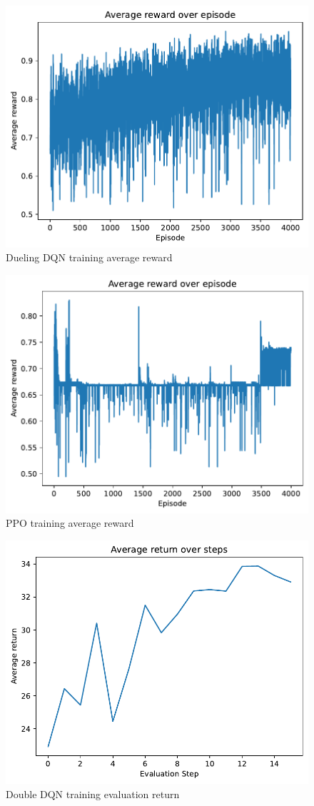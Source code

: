 \documentclass{article}
\begin{document}
\begin{figure}
    \centering
    \includegraphics[width=0.7\linewidth]{img/DuelDQN_training.pdf}
    \caption{Dueling DQN training average reward}
    \label{fig:Duel_DQN_reward_training}
\end{figure}

\begin{figure}
    \centering
    \includegraphics[width=0.7\linewidth]{img/PPO_training.pdf}
    \caption{PPO training average reward}
    \label{fig:PPO_reward_training}
\end{figure}

\begin{figure}
    \centering
    \includegraphics[width=0.7\linewidth]{img/DQN_training_eval_return.pdf}
    \caption{Double DQN training evaluation return}
    \label{fig:DQN_eval_return_training}
\end{figure}
\end{document}
